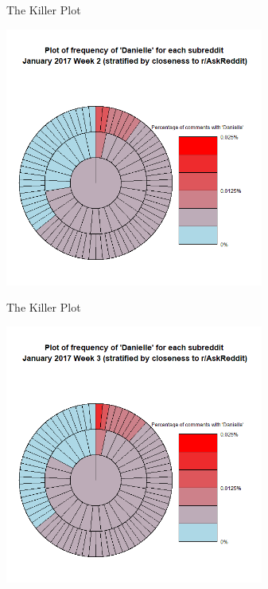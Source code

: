 \documentclass{beamer}
\begin{document}
\begin{frame}{The Killer Plot}
\begin{center}
\includegraphics[width=8.5cm,scale=1]{Plots/2017_jan_week2}
\end{center}
\end{frame}

\begin{frame}{The Killer Plot}
\begin{center}
\includegraphics[width=8.5cm,scale=1]{Plots/2017_jan_week3}
\end{center}
\end{frame}
\end{document}

